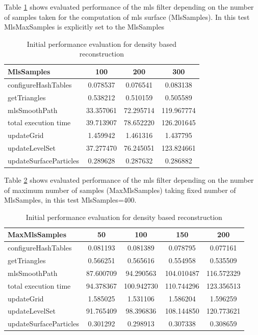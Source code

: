 Table \ref{tab:mls_ms_perf} shows evaluated performance of the mls filter depending on the number of samples taken for the computation of mls surface (MlsSamples). In this test MlsMaxSamples is explicitly set to the MlsSamples
\begin{table}[H]
	\begin{center}
		\scriptsize
		\begin{tabular}{|l|c|c|c|}
			\hline
			MlsSamples & 100 & 200 & 300 \\
			\hline
			configureHashTables		&	0.078537	&	0.076541	&	0.083138\\
			getTriangles			&	0.538212	&	0.510159	&	0.505589\\
			mlsSmoothPath			&	33.357061	&	72.295714	&	119.967774\\
			total execution time	&	39.713907	&	78.652220	&	126.201645\\
			updateGrid				&	1.459942	&	1.461316	&	1.437795\\
			updateLevelSet			&	37.277470	&	76.245051	&	123.824661\\
			updateSurfaceParticles	&	0.289628	&	0.287632	&	0.286882\\
			\hline
		\end{tabular}
	\end{center}
	\caption{Initial performance evaluation for density based reconstruction}
	\label{tab:mls_ms_perf}
\end{table}
Table \ref{tab:mls_mms_perf} shows evaluated performance of the mls filter depending on the number of maximum number of samples  (MaxMlsSamples) taking fixed number of MlsSamples, in this test MlsSamples=400.
\begin{table}[H]
	\begin{center}
		\scriptsize
		\begin{tabular}{|l|c|c|c|c|}
			\hline
			MaxMlsSamples & 50 & 100 & 150 & 200 \\
			\hline
			configureHashTables     	& 0.081193	&	0.081389	& 0.078795		& 0.077161\\
			getTriangles    			& 0.566251	&	0.565616	& 0.554958		& 0.535509\\
			mlsSmoothPath   			& 87.600709	&	94.290563	& 104.010487	& 116.572329\\
			total execution time    	& 94.378367	&	100.942730	& 110.744296	& 123.356513\\
			updateGrid      			& 1.585025	&	1.531106	& 1.586204		& 1.596259\\
			updateLevelSet  			& 91.765409	&	98.396836	& 108.144850	& 120.773621\\
			updateSurfaceParticles  	& 0.301292	&	0.298913	& 0.307338		& 0.308659\\
			\hline
		\end{tabular}
	\end{center}
	\caption{Initial performance evaluation for density based reconstruction}
	\label{tab:mls_mms_perf}
\end{table}
